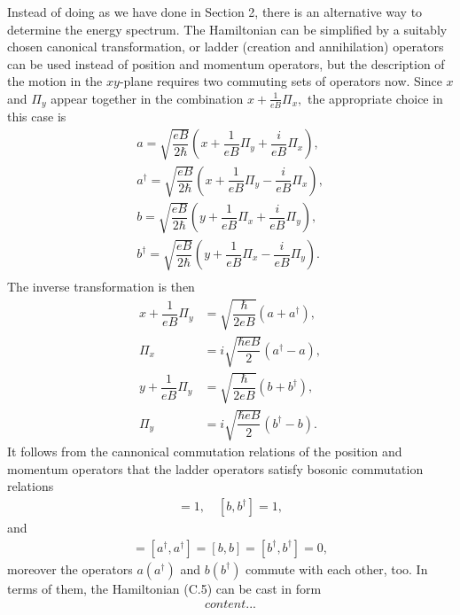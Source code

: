 \documentclass{report}
\newcommand{\f}[2]{\dfrac{#1}{#2}}
\begin{document}
Instead of doing as we have done in Section 2, there is an alternative way to determine the energy spectrum. The Hamiltonian can be simplified by a suitably chosen canonical transformation, or ladder (creation and annihilation) operators can be used instead of position and momentum operators, but the description of the motion in the $xy$-plane requires two commuting sets of operators now. Since $x$ and $\Pi_{y}$ appear together in the combination $x + \frac{1}{eB} \Pi_{x},$
the appropriate choice in this case is  \cite{solyom2008fundamentals,griffiths2018introduction}
\begin{equation}
	\begin{aligned}
		a = \sqrt{\f{eB}{2\hbar}} \left(x + \f{1}{eB} \Pi_{y} + \f{i}{eB} \Pi_{x}\right), \\
		a^{\dagger} = \sqrt{\f{eB}{2\hbar}} \left(x + \f{1}{eB} \Pi_{y} - \f{i}{eB} \Pi_{x}\right), \\
		b = \sqrt{\f{eB}{2\hbar}} \left(y + \f{1}{eB} \Pi_{x} + \f{i}{eB} \Pi_{y}\right), \\
		b^{\dagger} = \sqrt{\f{eB}{2\hbar}} \left(y + \f{1}{eB} \Pi_{x} - \f{i}{eB} \Pi_{y}\right). \\
	\end{aligned}
\end{equation}
The inverse transformation is then
\begin{equation}
	\begin{aligned}
		x + \f{1}{eB} \Pi_{y} &= \sqrt{\f{\hbar}{2eB}} \left(a + a^{\dagger}\right) ,\\
		\Pi_{x} &= i \sqrt{\f{\hbar eB}{2}} \left(a^{\dagger} - a\right) , \\
		y + \f{1}{eB} \Pi_{y} &= \sqrt{\f{\hbar}{2eB}} \left(b + b^{\dagger}\right) ,\\
		\Pi_{y} &= i \sqrt{\f{\hbar eB}{2}} \left(b^{\dagger} - b\right).
	\end{aligned}
\end{equation}
It follows from the cannonical commutation relations of the position and momentum operators that the ladder operators satisfy bosonic commutation relations
\begin{gather}
	[a,a^{\dagger}] = 1, \quad [b,b^{\dagger}] = 1,
\end{gather}
and
\begin{gather}
	[a,a] = [a^{\dagger},a^{\dagger}] = [b,b] = [b^{\dagger},b^{\dagger}] = 0,
\end{gather}
moreover the operators $a (a^{\dagger})$ and $b (b^{\dagger})$ commute with each other, too. In terms of them, the Hamiltonian (C.5) can be cast in form
\begin{equation}
	\begin{aligned}
		content...
	\end{aligned}
\end{equation}
\end{document}
